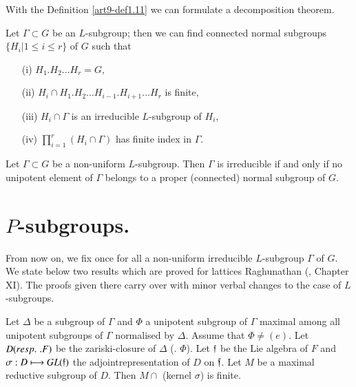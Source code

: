 With the Definition \ref{art9-def1.11} we can formulate a decomposition theorem.

\begin{coro}\label{art9-coro1.13}
Let $\Gamma \subset G$ be an $L$-subgroup; then we can find connected normal subgroups $\{H_i \big| 1 \leqslant i \leqslant r\}$ of $G$ such that 
\begin{itemize}
\item[{\rm (i)}] $H_1 . H_2 \ldots H_r = G$,

\item[{\rm (ii)}] $H_i \cap H_1 . H_2 \ldots H_{i-1}. H_{i+1} \ldots H_r$ is finite,

\item[{\rm (iii)}] $H_i \cap \Gamma$ is an irreducible $L$-subgroup of $H_i$,

\item[{\rm (iv)}] $\prod\limits^{r}_{i=1} (H_i \cap \Gamma)$ has finite index in $\Gamma$. 
\end{itemize}
\end{coro}

\begin{coro}\label{art9-coro1.14}
Let $\Gamma \subset G$ be a non-uniform $L$-subgroup. Then $\Gamma$ is irreducible if and only if no unipotent element of $\Gamma$ belongs to a proper (connected) normal subgroup of $G$.
\end{coro}

\section{$P$-subgroups.}\label{art9-sec2}
From now on, we fix once for all a non-uniform irreducible $L$-subgroup $\Gamma$ of $G$. We state below two results which are proved for lattices Raghunathan (\cite{art9-raghunathan-1}, Chapter XI). The proofs given there carry over with minor verbal changes to the case of $L$-subgroups.


\begin{theorem}\label{art9-thm2.1}
Let $\Delta$ be a subgroup of $\Gamma$ and $\Phi$ a unipotent subgroup of $\Gamma$ maximal among all unipotent subgroups of $\Gamma$ normalised by $\Delta$. Assume that $\Phi \neq (e)$. Let $D({resp.}\kern.3em. F)$ be the zariski-closure of $\Delta$ (\resp. $\Phi$). Let $\mathfrak{f}$ be the Lie algebra of $F$ and $\sigma : D \longmapsto G L(\mathfrak{f})$ the adjoint\pageoriginale representation of $D$ on $\mathfrak{f}$. Let $M$ be a maximal reductive subgroup of $D$. Then $M \cap$ (kernel $\sigma$) is finite.
\end{theorem}

